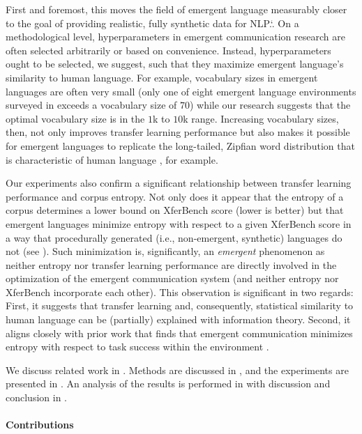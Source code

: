 First and foremost, this moves the field of emergent language measurably closer to the goal of providing realistic, fully synthetic data for NLP.\spacefactor\sfcode`.{}
On a methodological level, hyperparameters in emergent communication research are often selected arbitrarily or based on convenience.
Instead, hyperparameters ought to be selected, we suggest, such that they maximize emergent language's similarity to human language.
For example, vocabulary sizes in emergent languages are often very small (only one of eight emergent language environments surveyed in \citet{elcc} exceeds a vocabulary size of $70$) while our research suggests that the optimal vocabulary size is in the $1$k to $10$k range.
Increasing vocabulary sizes, then, not only improves transfer learning performance but also makes it possible for emergent languages to replicate the long-tailed, Zipfian word distribution that is characteristic of human language \citep{zipf,piantadosi2014zipf}, for example.

Our experiments also confirm a significant relationship between transfer learning performance and corpus entropy.
Not only does it appear that the entropy of a corpus determines a lower bound on XferBench score (lower is better) but that emergent languages minimize entropy with respect to a given XferBench score in a way that procedurally generated (i.e., non-emergent, synthetic) languages do not (see ).
Such minimization is, significantly, an \emph{emergent} phenomenon as neither entropy nor transfer learning performance are directly involved in the optimization of the emergent communication system (and neither entropy nor XferBench incorporate each other).
This observation is significant in two regards:
  First, it suggests that transfer learning and, consequently, statistical similarity to human language can be (partially) explained with information theory.
  Second, it aligns closely with prior work that finds that emergent communication minimizes entropy with respect to task success within the environment \citep{kharitonov2020entmin,chaabouni2022emergent}.

We discuss related work in .
Methods are discussed in , and the experiments are presented in .
An analysis of the results is performed in  with discussion and conclusion in .

\paragraph{Contributions}


